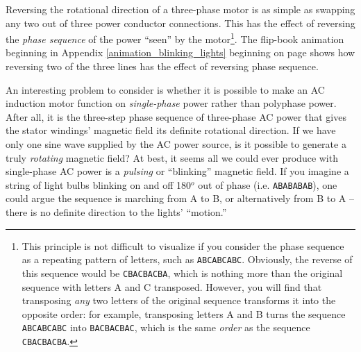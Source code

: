 \vskip 10pt

Reversing the rotational direction of a three-phase motor is as simple as swapping any two out of three power conductor connections.  This has the effect of reversing the \textit{phase sequence} of the power ``seen'' by the motor\footnote{This principle is not difficult to visualize if you consider the phase sequence as a repeating pattern of letters, such as \texttt{ABCABCABC}.  Obviously, the reverse of this sequence would be \texttt{CBACBACBA}, which is nothing more than the original sequence with letters A and C transposed.  However, you will find that transposing \textit{any} two letters of the original sequence transforms it into the opposite order: for example, transposing letters A and B turns the sequence \texttt{ABCABCABC} into \texttt{BACBACBAC}, which is the same \textit{order} as the sequence \texttt{CBACBACBA}.}.  The flip-book animation beginning in Appendix \ref{animation_blinking_lights} beginning on page \pageref{animation_blinking_lights} shows how reversing two of the three lines has the effect of reversing phase sequence.  


\vskip 10pt

An interesting problem to consider is whether it is possible to make an AC induction motor function on \textit{single-phase} power rather than polyphase power.  After all, it is the three-step phase sequence of three-phase AC power that gives the stator windings' magnetic field its definite rotational direction.  If we have only one sine wave supplied by the AC power source, is it possible to generate a truly \textit{rotating} magnetic field?  At best, it seems all we could ever produce with single-phase AC power is a \textit{pulsing} or ``blinking'' magnetic field.  If you imagine a string of light bulbs blinking on and off 180$^{o}$ out of phase (i.e. \texttt{ABABABAB}), one could argue the sequence is marching from A to B, or alternatively from B to A -- there is no definite direction to the lights' ``motion.''  

\filbreak

